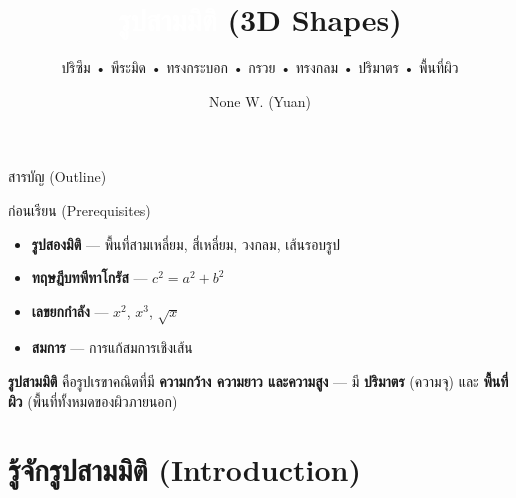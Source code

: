 \documentclass[11pt, aspectratio=169]{beamer}
\title[รูปสามมิติ]{\textcolor{white}{รูปสามมิติ} \textcolor{boxBlue!60}{(3D Shapes)}}
\subtitle{ปริซึม • พีระมิด • ทรงกระบอก • กรวย • ทรงกลม • ปริมาตร • พื้นที่ผิว }
\author[None W. (Yuan)]{None W. (Yuan)}
\date{}
\begin{document}
\begin{frame}[plain]\titlepage\end{frame}
\begin{frame}{สารบัญ (Outline)}\tableofcontents\end{frame}

\begin{frame}{ก่อนเรียน (Prerequisites)}
  \begin{explanation}
    \begin{itemize}
      \item \textbf{รูปสองมิติ} — พื้นที่สามเหลี่ยม, สี่เหลี่ยม, วงกลม, เส้นรอบรูป
      \item \textbf{ทฤษฎีบทพีทาโกรัส} — $c^2 = a^2 + b^2$
      \item \textbf{เลขยกกำลัง} — $x^2$, $x^3$, $\sqrt{x}$
      \item \textbf{สมการ} — การแก้สมการเชิงเส้น
    \end{itemize}
  \end{explanation}

  \begin{intuition}
    \textbf{รูปสามมิติ} คือรูปเรขาคณิตที่มี \textbf{ความกว้าง ความยาว และความสูง}
    — มี \textbf{ปริมาตร} (ความจุ) และ \textbf{พื้นที่ผิว} (พื้นที่ทั้งหมดของผิวภายนอก)
  \end{intuition}
\end{frame}

\section{รู้จักรูปสามมิติ (Introduction)}
\end{document}
